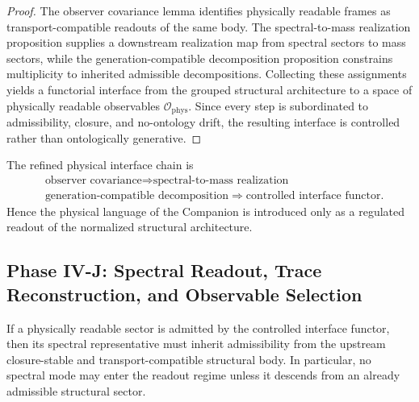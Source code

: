 \begin{proof}
The observer covariance lemma identifies physically readable frames as transport-compatible readouts of the same body. The spectral-to-mass realization proposition supplies a downstream realization map from spectral sectors to mass sectors, while the generation-compatible decomposition proposition constrains multiplicity to inherited admissible decompositions. Collecting these assignments yields a functorial interface from the grouped structural architecture to a space of physically readable observables $\mathcal O_{\mathrm{phys}}$. Since every step is subordinated to admissibility, closure, and no-ontology drift, the resulting interface is controlled rather than ontologically generative.
\end{proof}

\begin{corollary}
\label{cor:refined-physical-interface-chain}
The refined physical interface chain is
\[
\begin{aligned}
&\text{observer covariance}
 \Longrightarrow \text{spectral-to-mass realization}\\
&\text{generation-compatible decomposition}
 \Longrightarrow \text{controlled interface functor}.
\end{aligned}
\]
Hence the physical language of the Companion is introduced only as a regulated readout of the normalized structural architecture.
\end{corollary}








\subsection*{Phase IV-J: Spectral Readout, Trace Reconstruction, and Observable Selection}

\begin{lemma}
\label{lem:spectral-admissibility-inheritance}
If a physically readable sector is admitted by the controlled interface functor, then its spectral representative must inherit admissibility from the upstream closure-stable and transport-compatible structural body. In particular, no spectral mode may enter the readout regime unless it descends from an already admissible structural sector.
\end{lemma}

